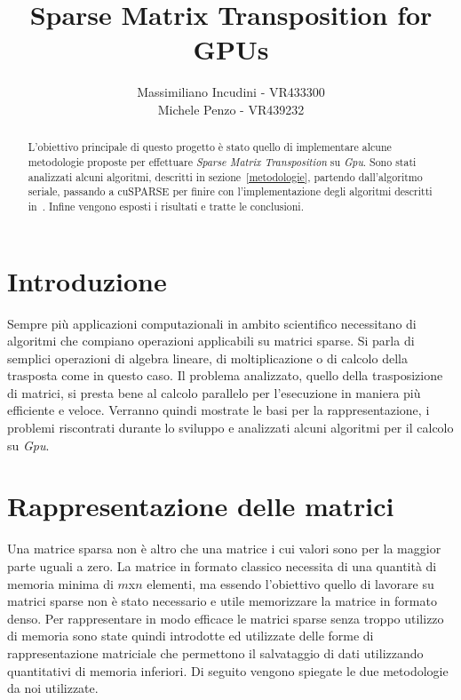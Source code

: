 \documentclass[]{IEEEtran}
\title{Sparse Matrix Transposition for GPUs}
\author{Massimiliano Incudini - VR433300\\Michele Penzo - VR439232}
\begin{document}
\maketitle

\begin{abstract}
	L'obiettivo principale di questo progetto è stato quello di implementare alcune metodologie proposte per effettuare \textit{Sparse Matrix Transposition} su \textit{Gpu}.
	Sono stati analizzati alcuni algoritmi, descritti in sezione~\ref{metodologie}, partendo dall'algoritmo seriale, passando a cuSPARSE per finire con l'implementazione degli algoritmi descritti in~\cite{parallelTrans}.
	Infine vengono esposti i risultati e tratte le conclusioni.
\end{abstract}


\section{Introduzione}
\label{introduzione}
	Sempre più applicazioni computazionali in ambito scientifico necessitano di algoritmi che compiano operazioni applicabili su matrici sparse. Si parla di semplici operazioni di algebra lineare, di moltiplicazione o di calcolo della trasposta come in questo caso.\newline
	Il problema analizzato, quello della trasposizione di matrici, si presta bene al calcolo parallelo per l'esecuzione in maniera più efficiente e veloce. Verranno quindi mostrate le basi per la rappresentazione, i problemi riscontrati durante lo sviluppo e analizzati alcuni algoritmi per il calcolo su \textit{Gpu}.\newline


\section{Rappresentazione delle matrici}
\label{rappresentazione}
	Una matrice sparsa non è altro che una matrice i cui valori sono per la maggior parte uguali a zero. La matrice in formato classico necessita di una quantità di memoria minima di $ m $x$ n $ elementi, ma essendo l'obiettivo quello di lavorare su matrici sparse non è stato necessario e utile memorizzare la matrice in formato denso.\newline
	Per rappresentare in modo efficace le matrici sparse senza troppo utilizzo di memoria sono state quindi introdotte ed utilizzate delle forme di rappresentazione matriciale che permettono il salvataggio di dati utilizzando quantitativi di memoria inferiori.\newline
	Di seguito vengono spiegate le due metodologie da noi utilizzate.
	
\end{document}
